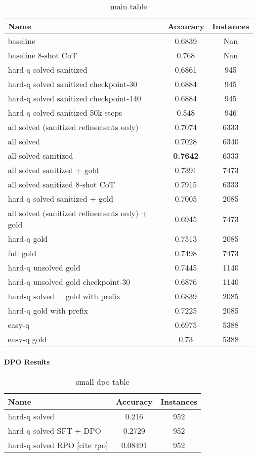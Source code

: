 \documentclass[a4paper,10pt]{article}
\begin{document}
\begin{table}[ht]
\centering
\begin{tabular}{lcc}

Name & Accuracy & Instances \\
\hline
baseline & 0.6839 & Nan\\
baseline 8-shot CoT & 0.768 & Nan \\
hard-q solved sanitized& 0.6861 & 945\\
hard-q solved sanitized checkpoint-30 & 0.6884 & 945\\
hard-q solved sanitized checkpoint-140 & 0.6884 & 945\\
hard-q solved sanitized 50k steps &  0.548  & 946 \\
all solved (sanitized refinements only)& 0.7074 & 6333\\
all solved & 0.7028 & 6340\\
all solved sanitized & \textbf{0.7642}  & 6333\\
all solved sanitized + gold & 0.7391 & 7473 \\
all solved sanitized 8-shot CoT & 0.7915 & 6333 \\ 
hard-q solved sanitized + gold & 0.7005  & 2085\\
all solved (sanitized refinements only) + gold & 0.6945 & 7473 \\
hard-q gold & 0.7513 & 2085 \\
full gold & 0.7498 & 7473 \\
hard-q unsolved gold & 0.7445 & 1140 \\
hard-q unsolved gold checkpoint-30 & 0.6876 & 1140 \\
hard-q solved + gold with prefix & 0.6839 & 2085 \\
hard-q gold with prefix & 0.7225 & 2085 \\
easy-q & 0.6975 & 5388 \\ 
easy-q gold & 0.73 & 5388 \\
\end{tabular}
\caption{main table}
\end{table}

\paragraph{DPO Results}

\begin{table}[ht]
\centering
 \begin{tabular}{lcc}
 Name & Accuracy & Instances \\
 \hline
 hard-q solved & 0.216 & 952 \\
 hard-q solved SFT + DPO & 0.2729 & 952 \\
 hard-q solved RPO [cite rpo] & 0.08491 & 952 \\
 \end{tabular}
 \caption{small dpo table}
\end{table}
\end{document}
